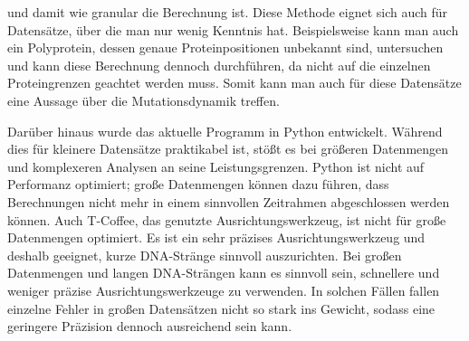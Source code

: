 \documentclass[german,version-2022-01]{uzl-thesis}
\begin{document}
und damit wie granular die Berechnung ist. Diese Methode eignet sich auch f\"ur Datens\"atze, \"uber die man nur wenig Kenntnis hat. Beispielsweise kann man auch ein Polyprotein, dessen genaue Proteinpositionen unbekannt sind, untersuchen und kann diese Berechnung dennoch durchf\"uhren, da nicht auf die einzelnen Proteingrenzen geachtet werden muss. Somit kann man auch f\"ur diese Datens\"atze eine Aussage \"uber die Mutationsdynamik treffen.  

Dar\"uber hinaus wurde das aktuelle Programm in Python entwickelt. W\"ahrend dies f\"ur kleinere Datens\"atze praktikabel ist, st\"o\ss{}t es bei gr\"o\ss{}eren Datenmengen und komplexeren Analysen an seine Leistungsgrenzen. Python ist nicht auf Performanz optimiert; gro\ss{}e Datenmengen k\"onnen dazu f\"uhren, dass Berechnungen nicht mehr in einem sinnvollen Zeitrahmen abgeschlossen werden k\"onnen. Auch T-Coffee, das genutzte Ausrichtungswerkzeug, ist nicht f\"ur gro\ss{}e Datenmengen optimiert. Es ist ein sehr pr\"azises Ausrichtungswerkzeug und deshalb geeignet, kurze DNA-Str\"ange sinnvoll auszurichten. Bei gro\ss{}en Datenmengen und langen DNA-Str\"angen kann es sinnvoll sein, schnellere und weniger pr\"azise Ausrichtungswerkzeuge zu verwenden. In solchen F\"allen fallen einzelne Fehler in gro\ss{}en Datens\"atzen nicht so stark ins Gewicht, sodass eine geringere Pr\"azision dennoch ausreichend sein kann.
\end{document}
